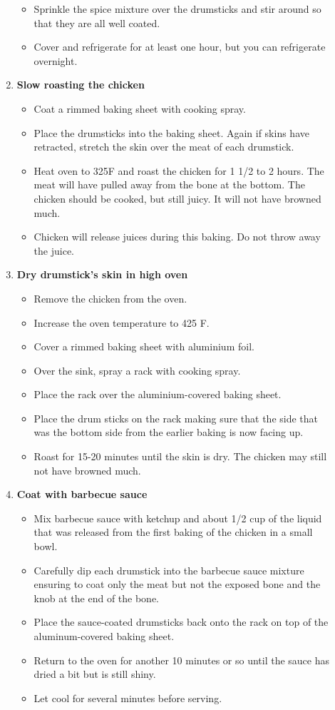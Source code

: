 \documentclass[11pt,letterpaper]{article}
\begin{document}
\begin{description}
\begin{enumerate}
\begin{itemize}
		\item Sprinkle the spice mixture over the drumsticks and stir around so that they are all well coated.
		\item Cover and refrigerate for at least one hour, but you can refrigerate overnight.
		\end{itemize}
	\item {\bf Slow roasting the chicken}
		\begin{itemize}
		\item Coat a rimmed baking sheet with cooking spray.
		\item Place the drumsticks into the baking sheet. Again if skins have retracted, stretch the skin over the meat of each drumstick.
		\item Heat oven to 325F and roast the chicken for 1 1/2 to 2 hours. The meat will have pulled away from the bone at the bottom. The chicken should be cooked, but still juicy. It will not have browned much.
		\item Chicken will release juices during this baking. Do not throw away the juice.
		\end{itemize}
	\item {\bf Dry drumstick's skin in high oven}
		\begin{itemize}
		 \item Remove the chicken from the oven.
		 \item Increase the oven temperature to 425 F.
		 \item Cover a rimmed baking sheet with aluminium foil.
		 \item Over the sink, spray a rack with cooking spray.
		 \item Place the rack over the aluminium-covered baking sheet.
		 \item Place the drum sticks on the rack making sure that the side that was the bottom side from the earlier baking is now facing up.
		 \item Roast for 15-20 minutes until the skin is dry. The chicken may still not have browned much.
		 \end{itemize}
	\item {\bf Coat with barbecue sauce}
		\begin{itemize}
		\item Mix barbecue sauce with ketchup and about 1/2 cup of the liquid that was released from the first baking of the chicken in a small bowl.
		\item Carefully dip each drumstick into the barbecue sauce mixture ensuring to coat only the meat but not the exposed bone and the knob at the end of the bone.
		\item Place the sauce-coated drumsticks back onto the rack on top of the aluminum-covered baking sheet.
		\item Return to the oven for another 10 minutes or so until the sauce has dried a bit but is still shiny.
		\item Let cool for several minutes before serving. 
		\end{itemize}
     	\end{enumerate}         
\end{description}
\end{document}
